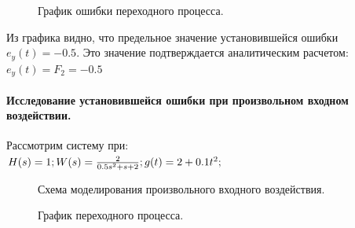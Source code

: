 \documentclass[a4paper, 11pt]{article}
\begin{document}
\begin{figure}[h]
    \caption{График ошибки переходного процесса.}
    \label{tree}
\end{figure}

Из графика видно, что предельное значение установившейся ошибки $e_y(t)=-0.5$. Это значение подтверждается аналитическим расчетом:
$e_y(t)=F_2=-0.5$
\newpage
\paragraph{Исследование установившейся ошибки при произвольном входном воздействии.} Рассмотрим систему при:\\
$H(s)=1; \\\\ 
W(s)=\frac {2} {0.5s^2+s+2}; \\\\  
g(t)=2+0.1t^2;$

\begin{figure}[h!]
    \caption{Схема моделирования произвольного входного воздействия.}
    \label{two}
\end{figure}

\begin{figure}[h!]
    \caption{График переходного процесса.}
    \label{two}
\end{figure}
    
\end{document}
